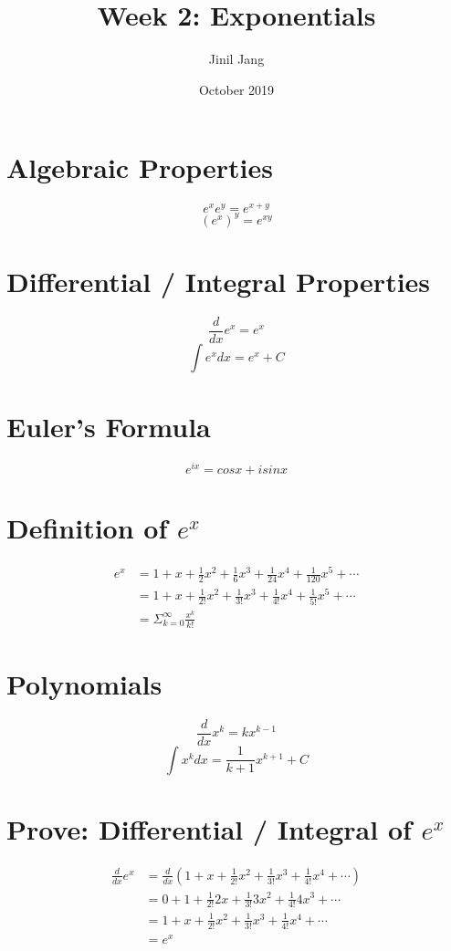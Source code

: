 \documentclass[a4paper,12pt]{article}
\title{Week 2: Exponentials}
\author{Jinil Jang }
\date{October 2019}
\begin{document}
\maketitle

\section{Algebraic Properties}

$$e^xe^y = e^{x+y}$$
$$(e^x)^y = e^{xy}$$

\section{Differential / Integral Properties}

$$\frac{d}{dx}e^x = e^x$$
$$\int e^xdx = e^x + C$$

\section{Euler's Formula}

$$e^{ix} = cos x + i sin x$$

\section{Definition of $e^x$}

\begin{equation}
\begin{split}
e^x & = 1 + x + \frac{1}{2}x^2 + \frac{1}{6}x^3 + \frac{1}{24}x^4 + \frac{1}{120}x^5 + \cdots \\
 & = 1 + x + \frac{1}{2!}x^2 + \frac{1}{3!}x^3 + \frac{1}{4!}x^4 + \frac{1}{5!}x^5 + \cdots \\
 & = \Sigma_{k=0}^\infty \frac{x^k}{k!} 
\end{split}
\end{equation}

\section{Polynomials}
$$\frac{d}{dx}x^k = kx^{k-1}$$
$$\int x^k dx = \frac{1}{k+1}x^{k+1} + C$$

\section{Prove: Differential / Integral of $e^x$}
\begin{equation}
\begin{split}
\frac{d}{dx}e^x & = \frac{d}{dx}(1 + x + \frac{1}{2!}x^2 + \frac{1}{3!}x^3 + \frac{1}{4!}x^4 + \cdots) \\
 & = 0 + 1 + \frac{1}{2!}2x + \frac{1}{3!}3x^2 + \frac{1}{4!}4x^3 + \cdots \\
 & = 1 + x + \frac{1}{2!}x^2 + \frac{1}{3!}x^3 + \frac{1}{4!}x^4 + \cdots \\
 & = e^x
\end{split}
\end{equation}
\end{document}
